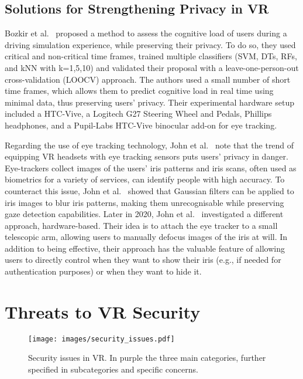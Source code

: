 \documentclass[journal]{IEEEtran}
\begin{document}
\subsection{Solutions for Strengthening Privacy in VR}
Bozkir et al.~\cite{bozkir2019} proposed a method to assess the cognitive load of users during a driving simulation experience, while preserving their privacy. To do so, they used critical and non-critical time frames, trained multiple classifiers (SVM, DTs, RFs, and kNN with k=1,5,10) and validated their proposal with a leave-one-person-out cross-validation (LOOCV) approach. The authors used a small number of short time frames, which allows them to predict cognitive load in real time using minimal data, thus preserving users' privacy.
Their experimental hardware setup included a HTC-Vive, a Logitech G27 Steering Wheel and Pedals, Phillips headphones, and a Pupil-Labs HTC-Vive binocular add-on for eye tracking.

Regarding the use of eye tracking technology, John et al.~\cite{john2019,john2020} note that the trend of equipping VR headsets with eye tracking sensors puts users' privacy in danger. Eye-trackers collect images of the users' iris patterns and iris scans, often used as biometrics for a variety of services, can identify people with high accuracy. 
To counteract this issue, John et al.~\cite{john2019} showed that Gaussian filters can be applied to iris images to blur iris patterns, making them unrecognisable while preserving gaze detection capabilities. Later in 2020, John et al.~\cite{john2020} investigated a different approach, hardware-based. Their idea is to attach the eye tracker to a small telescopic arm, allowing users to manually defocus images of the iris at will. In addition to being effective, their approach has the valuable feature of allowing users to directly control when they want to show their iris (e.g., if needed for authentication purposes) or when they want to hide it.


\section{Threats to VR Security}\label{sec:security}
\begin{figure*}[t]
	\center
	\texttt{[image: images/security\_issues.pdf]}
	\caption{Security issues in VR. In purple the three main categories, further specified in subcategories and specific concerns.}
	\label{fig:security}
\end{figure*}
\end{document}
